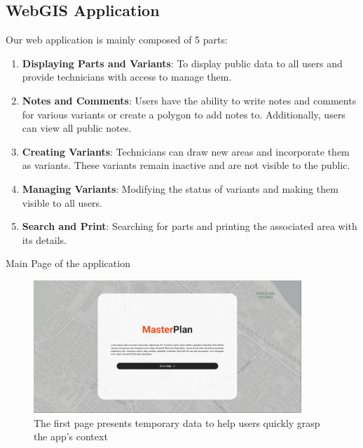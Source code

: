 \subsection{WebGIS Application}\label{subsec:fa-webgis-application}
Our web application is mainly composed of 5 parts:
\begin{enumerate}
    \item \textbf{Displaying Parts and Variants}: To display public data to all users and provide technicians with access to manage them.
    \item \textbf{Notes and Comments}: Users have the ability to write notes and comments for various variants or create a polygon to add notes to. Additionally, users can view all public notes.
    \item \textbf{Creating Variants}: Technicians can draw new areas and incorporate them as variants. These variants remain inactive and are not visible to the public.
    \item \textbf{Managing Variants}: Modifying the status of variants and making them visible to all users.
    \item \textbf{Search and Print}: Searching for parts and printing the associated area with its details.
\end{enumerate}

Main Page of the application
\begin{figure}[H]
    \centering
    \includegraphics[width=0.9\textwidth]{res/web/1-maste-plan intro}
    \caption{The first page presents temporary data to help users quickly grasp the app's context}
    \label{fig:web-main}
\end{figure}

